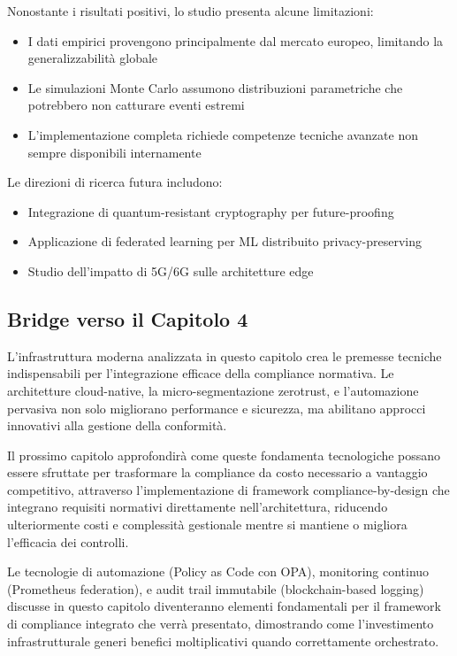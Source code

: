 Nonostante i risultati positivi, lo studio presenta alcune limitazioni:

\begin{itemize}
    \item I dati empirici provengono principalmente dal mercato europeo, limitando la generalizzabilità globale
    \item Le simulazioni Monte Carlo assumono distribuzioni parametriche che potrebbero non catturare eventi estremi
    \item L'implementazione completa richiede competenze tecniche avanzate non sempre disponibili internamente
\end{itemize}

Le direzioni di ricerca futura includono:
\begin{itemize}
    \item Integrazione di quantum-resistant cryptography per future-proofing
    \item Applicazione di federated learning per ML distribuito privacy-preserving
    \item Studio dell'impatto di 5G/6G sulle architetture edge
\end{itemize}

\subsection{\texorpdfstring{Bridge verso il Capitolo 4}{3.8.7 - Bridge verso il Capitolo 4}}

L'infrastruttura moderna analizzata in questo capitolo crea le premesse tecniche indispensabili per l'integrazione efficace della compliance normativa. Le architetture cloud-native, la micro-segmentazione \gls{zerotrust}, e l'automazione pervasiva non solo migliorano performance e sicurezza, ma abilitano approcci innovativi alla gestione della conformità.

Il prossimo capitolo approfondirà come queste fondamenta tecnologiche possano essere sfruttate per trasformare la compliance da costo necessario a vantaggio competitivo, attraverso l'implementazione di framework compliance-by-design che integrano requisiti normativi direttamente nell'architettura, riducendo ulteriormente costi e complessità gestionale mentre si mantiene o migliora l'efficacia dei controlli.

Le tecnologie di automazione (Policy as Code con OPA), monitoring continuo (Prometheus federation), e audit trail immutabile (blockchain-based logging) discusse in questo capitolo diventeranno elementi fondamentali per il framework di compliance integrato che verrà presentato, dimostrando come l'investimento infrastrutturale generi benefici moltiplicativi quando correttamente orchestrato.

